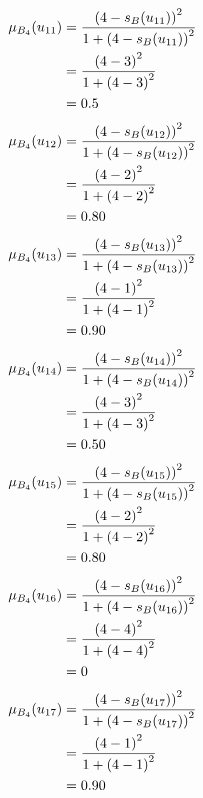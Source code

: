 \documentclass[a4paper,openany]{book}
\begin{document}
				\begin{align}
					\mu_{B_4}(u_{11}) &= \frac{\left(4-s_B(u_{11})\right)^2}{1 + \left(4-s_B(u_{11})\right)^2}\\
					&= \frac{\left(4-3\right)^2}{1 + \left(4-3\right)^2} \notag \\
					&= 0.5 \notag
				\end{align}
				\begin{align}
					\mu_{B_4}(u_{12}) &= \frac{\left(4-s_B(u_{12})\right)^2}{1 + \left(4-s_B(u_{12})\right)^2}\\
					&= \frac{\left(4-2\right)^2}{1 + \left(4-2\right)^2} \notag \\
					&= 0.80 \notag
				\end{align}
				\begin{align}
					\mu_{B_4}(u_{13}) &= \frac{\left(4-s_B(u_{13})\right)^2}{1 + \left(4-s_B(u_{13})\right)^2}\\
					&= \frac{\left(4-1\right)^2}{1 + \left(4-1\right)^2} \notag \\
					&= 0.90 \notag
				\end{align}
				\begin{align}
					\mu_{B_4}(u_{14}) &= \frac{\left(4-s_B(u_{14})\right)^2}{1 + \left(4-s_B(u_{14})\right)^2}\\
					&= \frac{\left(4-3\right)^2}{1 + \left(4-3\right)^2} \notag \\
					&= 0.50 \notag
				\end{align}
				\begin{align}
					\mu_{B_4}(u_{15}) &= \frac{\left(4-s_B(u_{15})\right)^2}{1 + \left(4-s_B(u_{15})\right)^2}\\
					&= \frac{\left(4-2\right)^2}{1 + \left(4-2\right)^2} \notag \\
					&= 0.80 \notag
				\end{align}
				\begin{align}
					\mu_{B_4}(u_{16}) &= \frac{\left(4-s_B(u_{16})\right)^2}{1 + \left(4-s_B(u_{16})\right)^2}\\
					&= \frac{\left(4-4\right)^2}{1 + \left(4-4\right)^2} \notag \\
					&= 0 \notag
				\end{align}
				\begin{align}
					\mu_{B_4}(u_{17}) &= \frac{\left(4-s_B(u_{17})\right)^2}{1 + \left(4-s_B(u_{17})\right)^2}\\
					&= \frac{\left(4-1\right)^2}{1 + \left(4-1\right)^2} \notag \\
					&= 0.90 \notag
				\end{align}
\end{document}
